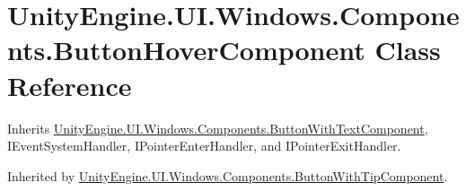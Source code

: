 \hypertarget{class_unity_engine_1_1_u_i_1_1_windows_1_1_components_1_1_button_hover_component}{}\section{Unity\+Engine.\+U\+I.\+Windows.\+Components.\+Button\+Hover\+Component Class Reference}
\label{class_unity_engine_1_1_u_i_1_1_windows_1_1_components_1_1_button_hover_component}


Inherits \hyperlink{class_unity_engine_1_1_u_i_1_1_windows_1_1_components_1_1_button_with_text_component}{Unity\+Engine.\+U\+I.\+Windows.\+Components.\+Button\+With\+Text\+Component}, I\+Event\+System\+Handler, I\+Pointer\+Enter\+Handler, and I\+Pointer\+Exit\+Handler.



Inherited by \hyperlink{class_unity_engine_1_1_u_i_1_1_windows_1_1_components_1_1_button_with_tip_component}{Unity\+Engine.\+U\+I.\+Windows.\+Components.\+Button\+With\+Tip\+Component}.

